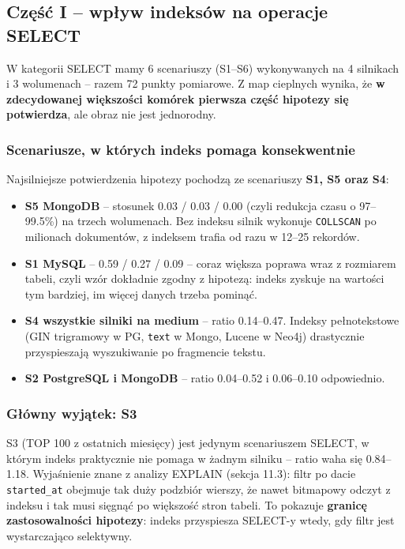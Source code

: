 \subsection{Część I -- wpływ indeksów na operacje SELECT}

W kategorii SELECT mamy 6 scenariuszy (S1--S6) wykonywanych na
4 silnikach i 3 wolumenach -- razem 72 punkty pomiarowe. Z map
cieplnych wynika, że \textbf{w zdecydowanej większości komórek
pierwsza część hipotezy się potwierdza}, ale obraz nie jest
jednorodny.

\subsubsection*{Scenariusze, w których indeks pomaga konsekwentnie}

Najsilniejsze potwierdzenia hipotezy pochodzą ze scenariuszy
\textbf{S1, S5 oraz S4}:

\begin{itemize}
    \item \textbf{S5 MongoDB} -- stosunek 0.03 / 0.03 / 0.00 (czyli
    redukcja czasu o 97--99.5\%) na trzech wolumenach. Bez indeksu
    silnik wykonuje \texttt{COLLSCAN} po milionach dokumentów,
    z indeksem trafia od razu w 12--25 rekordów.
    \item \textbf{S1 MySQL} -- 0.59 / 0.27 / 0.09 -- coraz większa
    poprawa wraz z rozmiarem tabeli, czyli wzór dokładnie zgodny
    z hipotezą: indeks zyskuje na wartości tym bardziej, im więcej
    danych trzeba pominąć.
    \item \textbf{S4 wszystkie silniki na medium} -- ratio 0.14--0.47.
    Indeksy pełnotekstowe (GIN trigramowy w PG, \texttt{text} w Mongo,
    Lucene w Neo4j) drastycznie przyspieszają wyszukiwanie po
    fragmencie tekstu.
    \item \textbf{S2 PostgreSQL i MongoDB} -- ratio 0.04--0.52
    i 0.06--0.10 odpowiednio.
\end{itemize}

\subsubsection*{Główny wyjątek: S3}

S3 (TOP 100 z ostatnich miesięcy) jest jedynym scenariuszem
SELECT, w którym indeks praktycznie nie pomaga w żadnym
silniku -- ratio waha się 0.84--1.18. Wyjaśnienie znane z analizy
EXPLAIN (sekcja 11.3): filtr po dacie \texttt{started\_at} obejmuje
tak duży podzbiór wierszy, że nawet bitmapowy odczyt z indeksu
i tak musi sięgnąć po większość stron tabeli. To pokazuje
\textbf{granicę zastosowalności hipotezy}: indeks przyspiesza
SELECT-y wtedy, gdy filtr jest wystarczająco selektywny.

